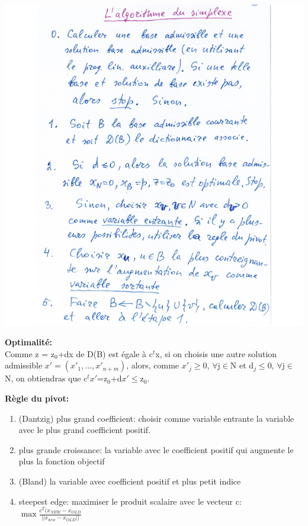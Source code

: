 \includegraphics[width=\linewidth,height=0.75\textheight]{notes/algorithme/algorithme_de_simplex.png}

\textbf{Optimalité:\\}
Comme z = z$_0$+dx de D(B) est égale à c$^t$x, si on choisis une autre solution admissible
$x'=(x'_1, ..., x'_{n+m})$, alors, comme $x'_j\geq$0, $\forall$j$\in$N et d$_j\leq$0, $\forall$j$\in$N, on
obtiendras que c$^tx'$=z$_0$+d$x'\leq$z$_0$.

\textbf{Règle du pivot:}
\begin{enumerate}
	\item (Dantzig) plus grand coefficient: choisir comme variable entrante la variable avec le plus grand
	coefficient positif.
	\item plus grande croissance: la variable avec le coefficient positif qui augmente le plus la fonction objectif
	\item (Bland) la variable avec coefficient positif et plus petit indice
	\item steepest edge: maximiser le produit scalaire avec le vecteur c:
	$\max\frac{c^T(x_{NEW}-x_{OLD}}{||x_{new}-x_{OLD}||}$
\end{enumerate}
